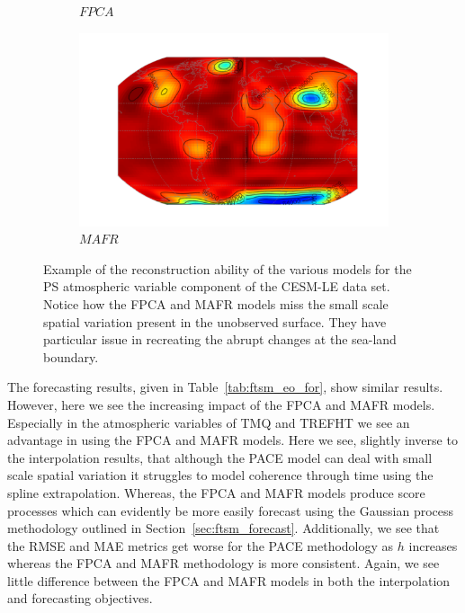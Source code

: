\begin{figure}
\begin{subfigure}[b]{0.45\textwidth}
 		\caption{$FPCA$}
 		\label{fig:ftsm_res_ps_fpca}
 	\end{subfigure}
 	\begin{subfigure}[b]{0.45\textwidth}
 		\includegraphics[width=\textwidth]{ftsm_res_ps_example_mafr}
 		\caption{$MAFR$}
 		\label{fig:ftsm_res_ps_mafr}
 	\end{subfigure}  
 	\caption[Example of the reconstruction ability of the various models for the PS atmospheric variable component of the CESM-LE data set.]{Example of the reconstruction ability of the various models for the PS atmospheric variable component of the CESM-LE data set. Notice how the FPCA and MAFR models miss the small scale spatial variation present in the unobserved surface. They have particular issue in recreating the abrupt changes at the sea-land boundary.}
 	\label{fig:ftsm_res_ps}
 \end{figure}

The forecasting results, given in Table~\ref{tab:ftsm_eo_for}, show similar results.
However, here we see the increasing impact of the FPCA and MAFR models. 
Especially in the atmospheric variables of TMQ and TREFHT we see an advantage in using the FPCA and MAFR models.
Here we see, slightly inverse to the interpolation results, that although the PACE model can deal with small scale spatial variation it struggles to model coherence through time using the spline extrapolation.
Whereas, the FPCA and MAFR models produce score processes which can evidently be more easily forecast using the Gaussian process methodology outlined in Section~\ref{sec:ftsm_forecast}.
Additionally, we see that the RMSE and MAE metrics get worse for the PACE methodology as $h$ increases whereas the FPCA and MAFR methodology is more consistent.
Again, we see little difference between the FPCA and MAFR models in both the interpolation and forecasting objectives. 

